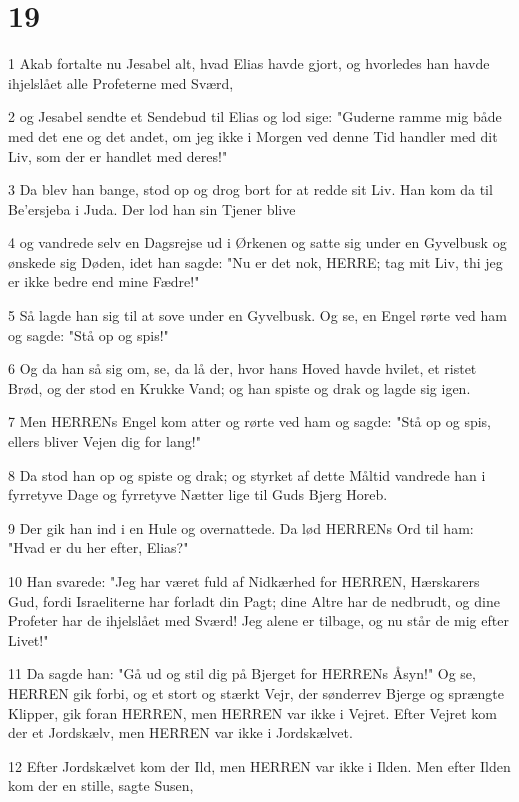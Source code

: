 \chapter{19}

\par 1 Akab fortalte nu Jesabel alt, hvad Elias havde gjort, og hvorledes han havde ihjelslået alle Profeterne med Sværd,
\par 2 og Jesabel sendte et Sendebud til Elias og lod sige: "Guderne ramme mig både med det ene og det andet, om jeg ikke i Morgen ved denne Tid handler med dit Liv, som der er handlet med deres!"
\par 3 Da blev han bange, stod op og drog bort for at redde sit Liv. Han kom da til Be'ersjeba i Juda. Der lod han sin Tjener blive
\par 4 og vandrede selv en Dagsrejse ud i Ørkenen og satte sig under en Gyvelbusk og ønskede sig Døden, idet han sagde: "Nu er det nok, HERRE; tag mit Liv, thi jeg er ikke bedre end mine Fædre!"
\par 5 Så lagde han sig til at sove under en Gyvelbusk. Og se, en Engel rørte ved ham og sagde: "Stå op og spis!"
\par 6 Og da han så sig om, se, da lå der, hvor hans Hoved havde hvilet, et ristet Brød, og der stod en Krukke Vand; og han spiste og drak og lagde sig igen.
\par 7 Men HERRENs Engel kom atter og rørte ved ham og sagde: "Stå op og spis, ellers bliver Vejen dig for lang!"
\par 8 Da stod han op og spiste og drak; og styrket af dette Måltid vandrede han i fyrretyve Dage og fyrretyve Nætter lige til Guds Bjerg Horeb.
\par 9 Der gik han ind i en Hule og overnattede. Da lød HERRENs Ord til ham: "Hvad er du her efter, Elias?"
\par 10 Han svarede: "Jeg har været fuld af Nidkærhed for HERREN, Hærskarers Gud, fordi Israeliterne har forladt din Pagt; dine Altre har de nedbrudt, og dine Profeter har de ihjelslået med Sværd! Jeg alene er tilbage, og nu står de mig efter Livet!"
\par 11 Da sagde han: "Gå ud og stil dig på Bjerget for HERRENs Åsyn!" Og se, HERREN gik forbi, og et stort og stærkt Vejr, der sønderrev Bjerge og sprængte Klipper, gik foran HERREN, men HERREN var ikke i Vejret. Efter Vejret kom der et Jordskælv, men HERREN var ikke i Jordskælvet.
\par 12 Efter Jordskælvet kom der Ild, men HERREN var ikke i Ilden. Men efter Ilden kom der en stille, sagte Susen,
